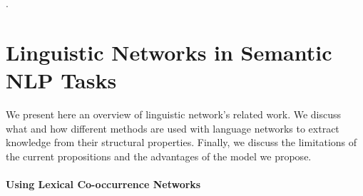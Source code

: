 .

\section{Linguistic Networks in Semantic NLP Tasks}\label{sec:ling_net_nlp}



We present here an overview of linguistic network's related work. We discuss what and how different methods are used with language networks to extract knowledge from their structural properties. Finally, we discuss the limitations of the current propositions and the advantages of the model we propose.



\paragraph{Using Lexical Co-occurrence Networks}

